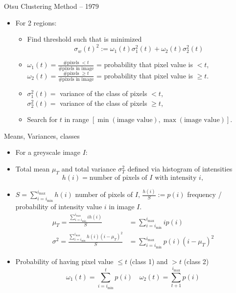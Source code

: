 \documentclass[9pt]{beamer}
\newcommand{\myemph}[1]{{\color{blue}{#1}}}
\begin{document}
\begin{frame}[t]{Otsu Clustering Method -- 1979}
  \begin{itemize}
  \item For 2 regions:\vfill
    \begin{itemize}
    \item Find threshold such that \myemph{intraclass variance} is minimized
      $$
      \sigma_w(t)^2 := \omega_1(t)\sigma_1^2(t) + \omega_2(t)\sigma_2^2(t)
      $$
      \vfill
    \item $\omega_1(t) = \frac{\# \text{pixels } < t}{\#\text{pixels in image}}$ =
      probability that pixel value is $<t$,
      $\omega_2(t) = \frac{\# \text{pixels } \geq t}{\#\text{pixels in image}}$ =
      probability that pixel value is $\geq t$.\vfill
    \item $\sigma_1^2(t) = $ variance of the class of pixels $< t$, \\
      $\sigma_2^2(t) = $ variance of the class of pixels $\geq t$, \vfill
    \item Search for $t$ in range $[\min(\text{image value}),\max(\text{image value})]$.
    \end{itemize}
    \vfill
  \end{itemize}
\end{frame}


\begin{frame}{Means, Variances, classes}
 
  \begin{itemize}[<+->]
  \item For a greyscale image $I$:
  \item Total mean $\mu_T$ and total variance $\sigma^2_T$ defined via histogram of intensities
    $$
    h(i) = \text{number of pixels of }I\text{ with intensity }i,
    $$
  \item $S = \sum_{i=i_{\min}}^{i_{\max}}h(i)$ number of pixels of $I$,
    $\frac{h(i)}{S} := p(i)$ frequency / probability of intensity value $i$ in image $I$.
    \begin{align*}
    \mu_T = \frac{\sum_{i=i_{\min}}^{i_{\max}} ih(i)}{S} &=\sum_{i=i_{\min}}^{i_{\max}} ip(i)\\
    \sigma^2 = \frac{\sum_{i=i_{\min}}^{i_{\max}} h(i)(i -\mu_T)^2}{S} &= \sum_{i=i_{\min}}^{i_{\max}} p(i)(i-\mu_T)^2
    \end{align*}
  \item Probability of having pixel value $\leq t$ (class 1) and $> t$ (class 2)
    $$
    \omega_1(t) = \sum_{i=i_{\min}}^t p(i)\quad \omega_2(t) = \sum_{t+1}^{i_{\max}} p(i)
    $$
  \end{itemize}
\end{frame}
\end{document}
